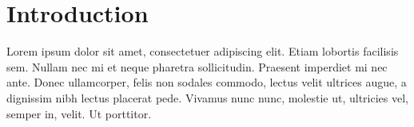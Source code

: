 
\section{Introduction}

\begin{frame}[plain]
  \begin{quag}[Introduction]
    Lorem ipsum dolor sit amet, consectetuer adipiscing elit.
    Etiam lobortis facilisis sem. Nullam nec mi et neque
    pharetra sollicitudin. Praesent imperdiet mi nec ante. Donec
    ullamcorper, felis non sodales commodo, lectus velit ultrices
    augue, a dignissim nibh lectus placerat pede. Vivamus nunc
    nunc, molestie ut, ultricies vel, semper in, velit. Ut porttitor.
  \end{quag}
\end{frame}

